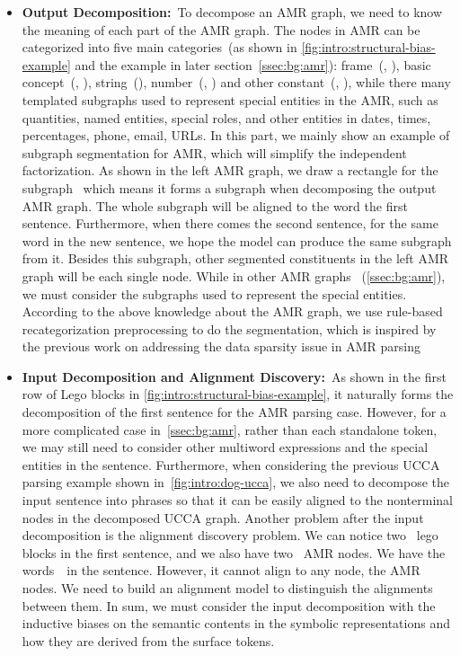 {\begin{itemize}
\item \textbf{Output Decomposition:}~To decompose an AMR graph, we
  need to know the meaning of each part of the AMR graph. The nodes in
  AMR can be categorized into five main categories~(as shown in
  \autoref{fig:intro:structural-bias-example} and the example in later
  section~\autoref{ssec:bg:amr}): frame~(\eg, 
  ), basic concept~(\eg, 
  ), string~(), number~(\eg,
  ) and other constant~(\eg, \tquoted{-}), while there
  many templated subgraphs used to represent special entities in the
  AMR, such as quantities, named entities, special roles, and other
  entities in dates, times, percentages, phone, email, URLs. In this
  part, we mainly show an example of subgraph segmentation for AMR,
  which will simplify the independent factorization. As shown in the
  left AMR graph, we draw a rectangle for the subgraph
  ~which means it forms a subgraph
  when decomposing the output AMR graph. The whole subgraph will be
  aligned to the word  the first
  sentence. Furthermore, when there comes the second sentence, for the
  same word  in the new sentence, we hope the model
  can produce the same subgraph 
  from it. Besides this subgraph, other segmented constituents in the
  left AMR graph will be each single node. While in other AMR graphs
  ~(\autoref{ssec:bg:amr}), we must consider the subgraphs used to
  represent the special entities. According to the above knowledge
  about the AMR graph, we use rule-based recategorization
  preprocessing to do the segmentation, which is inspired by the
  previous work on addressing the data sparsity issue in AMR
  parsing~\citep{Werling:2015up,foland-martin-2017-abstract,Wang:2017vt,Peng:2017ud}

\item \textbf{Input Decomposition and Alignment Discovery:}~As shown
  in the first row of Lego blocks in
  \autoref{fig:intro:structural-bias-example}, it naturally forms the
  decomposition of the first sentence for the AMR parsing
  case. However, for a more complicated case in~\autoref{ssec:bg:amr},
  rather than each standalone token, we may still need to consider
  other multiword expressions and the special entities in the
  sentence. Furthermore, when considering the previous UCCA parsing
  example shown in~\autoref{fig:intro:dog-ucca}, we also need to
  decompose the input sentence into phrases so that it can be easily
  aligned to the nonterminal nodes in the decomposed UCCA graph.
  Another problem after the input decomposition is the alignment
  discovery problem. We can notice two ~lego blocks in
  the first sentence, and we also have two ~AMR nodes. We
  have the words~~in the sentence. However, it cannot
  align to any node, the AMR nodes. We need to build an alignment
  model to distinguish the alignments between them. In sum, we must
  consider the input decomposition with the inductive biases on the
  semantic contents in the symbolic representations and how they are
  derived from the surface tokens.


\end{itemize}}
